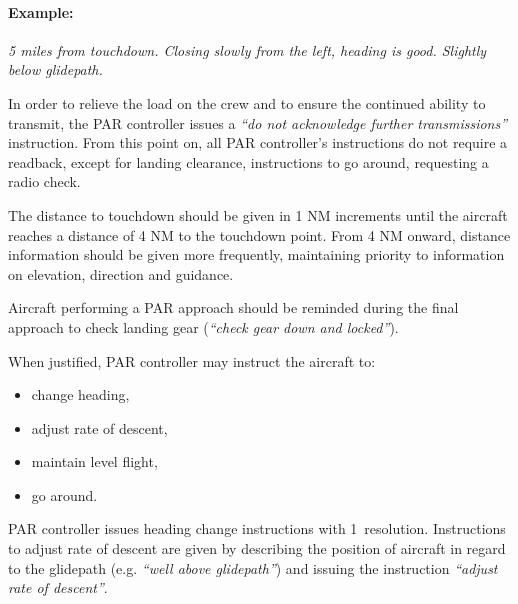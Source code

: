 \paragraph{Example:} \textit{5 miles from touchdown. Closing slowly from the left, heading is good. Slightly below glidepath.}

In order to relieve the load on the crew and to ensure the continued ability to transmit, the PAR controller issues a \textit{``do not acknowledge further transmissions''} instruction. From this point on, all PAR controller's instructions do not require a readback, except for landing clearance, instructions to go around, requesting a radio check.

The distance to touchdown should be given in 1 NM increments until the aircraft reaches a distance of 4 NM to the touchdown point. From 4 NM onward, distance information should be given more frequently, maintaining priority to information on elevation, direction and guidance.

Aircraft performing a PAR approach should be reminded during the final approach
to check landing gear (\textit{``check gear down and locked''}).

When justified, PAR controller may instruct the aircraft to:
\begin{itemize}
    \item change heading,
    \item adjust rate of descent,
    \item maintain level flight,
    \item go around.
\end{itemize}
PAR controller issues heading change instructions with 1\degree~resolution. Instructions to adjust rate of descent are given by describing the position of aircraft in regard to the glidepath (e.g. \emph{``well above glidepath''}) and issuing the instruction \emph{``adjust rate of descent''}.